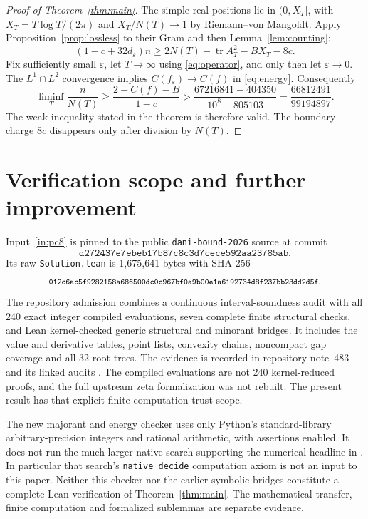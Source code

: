\documentclass[11pt,a4paper]{article}
\theoremstyle{remark}
\DeclareMathOperator{\tr}{tr}
\begin{document}
\begin{proof}[Proof of Theorem~\ref{thm:main}]
The simple real positions lie in $(0,X_T]$, with
$X_T=T\log T/(2\pi)$ and $X_T/N(T)\to1$ by
Riemann--von Mangoldt. Apply Proposition~\ref{prop:lossless}
to their Gram and then Lemma~\ref{lem:counting}:
\[
 (1-c+32d_\varepsilon)n
 \ge2N(T)-\tr A_T^2-BX_T-8c.
\]
Fix sufficiently small $\varepsilon$, let $T\to\infty$ using
\eqref{eq:operator}, and only then let $\varepsilon\to0$.
The $L^1\cap L^2$ convergence implies
$C(f_\varepsilon)\to C(f)$ in \eqref{eq:energy}.
Consequently
\[
 \liminf_T\frac{n}{N(T)}
 \ge\frac{2-C(f)-B}{1-c}
 >\frac{67216841-404350}{10^8-805103}
 =\frac{66812491}{99194897}.
\]
The weak inequality stated in the theorem is therefore valid.
The boundary charge $8c$ disappears only after division by $N(T)$.
\end{proof}

\section{Verification scope and further improvement}\label{sec:trust}

Input~\ref{in:pc8} is pinned to the public
\texttt{dani-bound-2026} source \cite{PC8} at commit
\[
\texttt{d272437e7ebeb17b87c8c3d7cece592aa23785ab}.
\]
Its raw \texttt{Solution.lean} is 1,675,641 bytes with SHA-256
\[
\texttt{\footnotesize 012c6ac5f9282158a686500dc0c967bf0a9b00e1a6192734d8f237bb23dd2d5f}.
\]
The repository admission combines a continuous interval-soundness
audit with all 240 exact integer compiled evaluations, seven complete
finite structural checks, and Lean kernel-checked generic structural
and minorant bridges. It includes the value and derivative tables,
point lists, convexity chains, noncompact gap coverage and all 32
root trees. The evidence is recorded in repository note~483
and its linked audits \cite{Repo}.
The compiled evaluations are not 240 kernel-reduced proofs, and
the full upstream zeta formalization was not rebuilt.
The present result has that explicit finite-computation trust scope.

The new majorant and energy checker uses only Python's standard-library
arbitrary-precision integers and rational arithmetic, with assertions
enabled. It does not run the much larger native search supporting
the numerical headline in \cite{Knaus}. In particular that search's
\texttt{native\_decide} computation axiom is not an input to this paper.
Neither this checker nor the earlier symbolic bridges constitute
a complete Lean verification of Theorem~\ref{thm:main}.
The mathematical transfer, finite computation and formalized
sublemmas are separate evidence.
\end{document}
